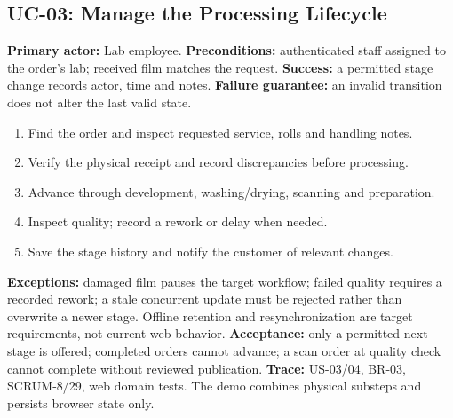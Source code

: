 \subsection{UC-03: Manage the Processing Lifecycle}
\textbf{Primary actor:} Lab employee. \textbf{Preconditions:} authenticated staff
assigned to the order's lab; received film matches the request.
\textbf{Success:} a permitted stage change records actor, time and notes.
\textbf{Failure guarantee:} an invalid transition does not alter the last valid state.
\begin{enumerate}
\item Find the order and inspect requested service, rolls and handling notes.
\item Verify the physical receipt and record discrepancies before processing.
\item Advance through development, washing/drying, scanning and preparation.
\item Inspect quality; record a rework or delay when needed.
\item Save the stage history and notify the customer of relevant changes.
\end{enumerate}
\textbf{Exceptions:} damaged film pauses the target workflow; failed quality
requires a recorded rework; a stale concurrent update must be rejected rather
than overwrite a newer stage. Offline retention and resynchronization are target
requirements, not current web behavior.
\textbf{Acceptance:} only a permitted next stage is offered; completed orders
cannot advance; a scan order at quality check cannot complete without reviewed
publication. \textbf{Trace:} US-03/04, BR-03, SCRUM-8/29, web domain tests.
The demo combines physical substeps and persists browser state only.

